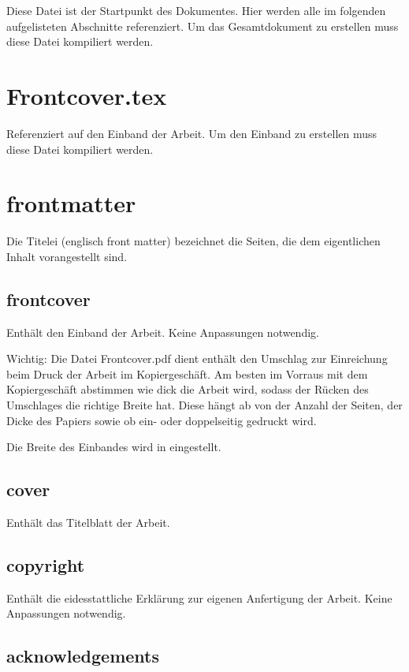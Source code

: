 Diese Datei ist der Startpunkt des Dokumentes. Hier werden alle im folgenden aufgelisteten Abschnitte referenziert. Um das Gesamtdokument zu erstellen muss diese Datei kompiliert werden.

\section*{Frontcover.tex}

Referenziert auf den Einband der Arbeit. Um den Einband zu erstellen muss diese Datei kompiliert werden.

\newpage

\section*{frontmatter}

Die Titelei (englisch front matter) bezeichnet die Seiten, die dem eigentlichen Inhalt vorangestellt sind.

\subsection*{frontcover}
\label{section:_01_frontcover}

Enthält den Einband der Arbeit. Keine Anpassungen notwendig.

Wichtig: Die Datei Frontcover.pdf dient enthält den Umschlag zur Einreichung beim Druck der Arbeit im Kopiergeschäft. Am besten im Vorraus mit dem Kopiergeschäft abstimmen wie dick die Arbeit wird, sodass der Rücken des Umschlages die richtige Breite hat. Diese hängt ab von der Anzahl der Seiten, der Dicke des Papiers sowie ob ein- oder doppelseitig gedruckt wird. 

Die Breite des Einbandes wird in  eingestellt.

\subsection*{cover}

Enthält das Titelblatt der Arbeit. 

\subsection*{copyright}

Enthält die eidesstattliche Erklärung zur eigenen Anfertigung der Arbeit. Keine Anpassungen notwendig.

\subsection*{acknowledgements}

